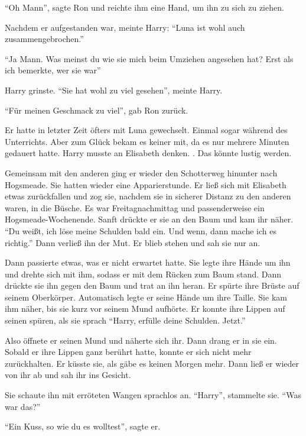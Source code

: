 \enquote{Oh Mann}, sagte Ron und reichte ihm eine Hand, um ihn zu sich zu ziehen.

Nachdem er aufgestanden war, meinte Harry: \enquote{Luna ist wohl auch zusammengebrochen.}

\enquote{Ja Mann. Was meinst du wie sie mich beim Umziehen angesehen hat? Erst als ich bemerkte, wer sie war\abs}

Harry grinste. \enquote{Sie hat wohl zu viel gesehen}, meinte Harry.

\enquote{Für meinen Geschmack zu viel}, gab Ron zurück.

Er hatte in letzter Zeit öfters mit Luna gewechselt. Einmal sogar während des Unterrichts. Aber zum Glück bekam es keiner mit, da es nur mehrere Minuten gedauert hatte. Harry musste an Elisabeth denken. . Das könnte lustig werden.

\trenn

Gemeinsam mit den anderen ging er wieder den Schotterweg hinunter nach Hogsmeade. Sie hatten wieder eine Apparierstunde. Er ließ sich mit Elisabeth etwas zurückfallen und zog sie, nachdem sie in sicherer Distanz zu den anderen waren, in die Büsche. Es war Freitagnachmittag und passenderweise ein Hogsmeade-Wochenende. Sanft drückte er sie an den Baum und kam ihr näher. \enquote{Du weißt, ich löse meine Schulden bald ein. Und wenn, dann mache ich es richtig.} Dann verließ ihn der Mut. Er blieb stehen und sah sie nur an.

Dann passierte etwas, was er nicht erwartet hatte. Sie legte ihre Hände um ihn und drehte sich mit ihm, sodass er mit dem Rücken zum Baum stand. Dann drückte sie ihn gegen den Baum und trat an ihn heran. Er spürte ihre Brüste auf seinem Oberkörper. Automatisch legte er seine Hände um ihre Taille. Sie kam ihm näher, bis sie kurz vor seinem Mund aufhörte. Er konnte ihre Lippen auf seinen spüren, als sie sprach \enquote{Harry, erfülle deine Schulden. Jetzt.}

Also öffnete er seinen Mund und näherte sich ihr. Dann drang er in sie ein. Sobald er ihre Lippen ganz berührt hatte, konnte er sich nicht mehr zurückhalten. Er küsste sie, als gäbe es keinen Morgen mehr. Dann ließ er wieder von ihr ab und sah ihr ins Gesicht.

Sie schaute ihn mit erröteten Wangen sprachlos an. \enquote{Harry}, stammelte sie. \enquote{Was war das?}

\enquote{Ein Kuss, so wie du es wolltest}, sagte er.

